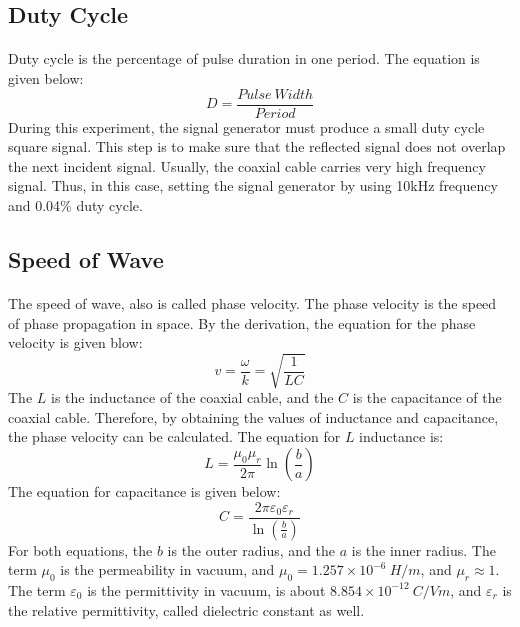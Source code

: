 \documentclass[12pt]{article}
\begin{document}
    
    \subsection{Duty Cycle}
    \paragraph{}
    Duty cycle is the percentage of pulse duration in one period. The equation is given below:
    \begin{equation}
        D=\frac{Pulse \ Width}{Period}
    \end{equation}
    During this experiment, the signal generator must produce a small duty cycle square signal. This step is to make sure that the reflected signal does not overlap the next incident signal. Usually, the coaxial cable carries very high frequency signal. Thus, in this case, setting the signal generator by using 10kHz frequency and 0.04\% duty cycle.  
    
    \subsection{Speed of Wave}
    \paragraph{}
    The speed of wave, also is called phase velocity. The phase velocity is the speed of phase propagation in space. By the derivation, the equation for the phase velocity is given blow:
    \begin{equation}
        v=\frac{\omega}{k}=\sqrt{\frac{1}{LC}}
    \end{equation}
    The $L$ is the inductance of the coaxial cable, and the $C$ is the capacitance of the coaxial cable. Therefore, by obtaining the values of inductance and capacitance, the phase velocity can be calculated. The equation for $L$ inductance is:
    \begin{equation}
        L=\frac{\mu_{0}\mu_{r}}{2\pi}\ln(\frac{b}{a})
    \end{equation}
    The equation for capacitance is given below:
    \begin{equation}
        C=\frac{2\pi\varepsilon_{0}\varepsilon_{r}}{\ln(\frac{b}{a})}
    \end{equation}
    For both equations, the $b$ is the outer radius, and the $a$ is the inner radius. The term $\mu_{0}$ is the permeability in vacuum, and $\mu_{0} = 1.257\times10^{-6}\ H/m$, and $\mu_{r}\approx1$. The term $\varepsilon_{0}$ is the permittivity in vacuum, is about $8.854 \times 10^{-12} \ C/V m$, and $\varepsilon_{r}$ is the relative permittivity, called dielectric constant as well. 
    
\end{document}
